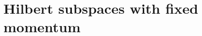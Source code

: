 \chapter{Hilbert subspaces with fixed momentum\label{app:momentum}}
\thispagestyle{chapterBeginStyle}
